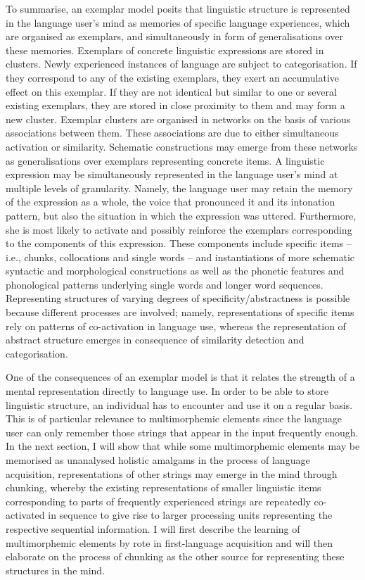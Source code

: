 To summarise, an exemplar model posits that linguistic structure is represented in the language user's mind as memories of specific language experiences, which are organised as exemplars, and simultaneously in form of generalisations over these memories. Exemplars of concrete linguistic expressions are stored in clusters. Newly experienced instances of language are subject to categorisation. If they correspond to any of the existing exemplars, they exert an accumulative effect on this exemplar. If they are not identical but similar to one or several existing exemplars, they are stored in close proximity to them and may form a new cluster. Exemplar clusters are organised in networks on the basis of various associations between them. These associations are due to either simultaneous activation or similarity. Schematic constructions may emerge from these networks as generalisations over exemplars representing concrete items. A linguistic expression may be simultaneously represented in the language user's mind at multiple levels of granularity. Namely, the language user may retain the memory of the expression as a whole, the voice that pronounced it and its intonation pattern, but also the situation in which the expression was uttered. Furthermore, she is most likely to activate and possibly reinforce the exemplars corresponding to the components of this expression. These components include specific items -- i.e., chunks, collocations and single words -- and instantiations of more schematic syntactic and morphological constructions as well as the phonetic features and phonological patterns underlying single words and longer word sequences. Representing structures of varying degrees of specificity/abstractness is possible because different processes are involved; namely, representations of specific items rely on patterns of co-activation in language use, whereas the representation of abstract structure emerges in consequence of similarity detection and categorisation.

One of the consequences of an exemplar model is that it relates the strength of a mental representation directly to language use. In order to be able to store linguistic structure, an individual has to encounter and use it on a regular basis. This is of particular relevance to multimorphemic elements since the language user can only remember those strings that appear in the input frequently enough. In the next section, I will show that while some multimorphemic elements may be memorised as unanalysed holistic amalgams in the process of language acquisition, representations of other strings may emerge in the mind through chunking, whereby the existing representations of smaller linguistic items corresponding to parts of frequently experienced strings are repeatedly co-activated in sequence to give rise to larger processing units representing the respective sequential information. I will first describe the learning of multimorphemic elements by rote in first-language acquisition and will then elaborate on the process of chunking as the other source for representing these structures in the mind.


